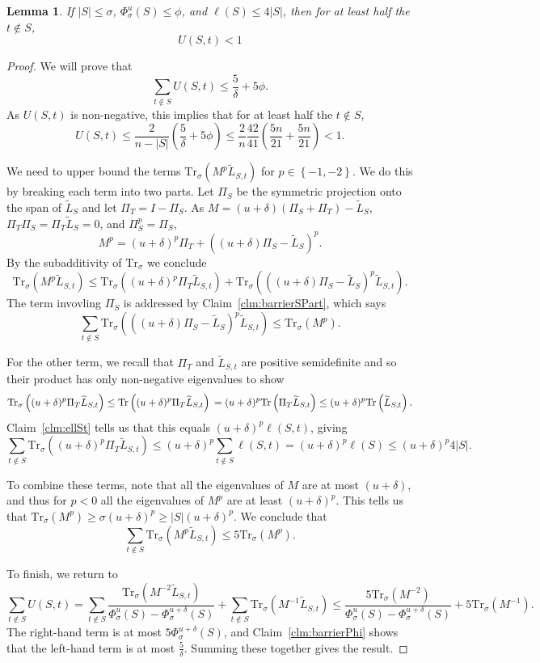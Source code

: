 \documentclass[11pt]{article}
\def\trace#1{\mathrm{Tr} \left(#1 \right)}
\def\Ltil{\widetilde{L}}
\def\setof#1{\left\{#1  \right\}}
\def\sizeof#1{\left|#1  \right|}
\def\trs#1{\mathrm{Tr}_{\sigma} \left(#1 \right)}
\def\Trs{\mathrm{Tr}_{\sigma}}
\newtheorem{lemma}[theorem]{Lemma}
\begin{document}
\begin{lemma}\label{lem:barrier}
If $\sizeof{S} \leq \sigma$, $\Phi^{u}_{\sigma} (S) \leq \phi$, and $\ell(S) \leq 4 \sizeof{S}$, then for at least half the $t \not \in S$, 
\[
U (S,t)
<
1
\]
\end{lemma}
\begin{proof}
We will prove that 
\[
\sum_{t \not \in S} U(S,t) \leq \frac{5}{\delta} + 5 \phi.
\]
As $U(S,t)$ is non-negative, this implies that for at least half the $t \not \in S$, 
\[
U(S,t) \leq \frac{2}{n - \sizeof{S}} \left( \frac{5}{\delta} + 5 \phi \right)
\leq \frac{2}{n} \frac{42}{41} \left( \frac{5 n}{21} + \frac{5 n}{21} \right)
< 1.
\]  

We need to upper bound the terms $\trs{M^{p} \Ltil_{S,t}}$ for $p \in \setof{-1,-2}$.
We do this by breaking each term into two parts.
Let $\Pi_{S}$ be the symmetric  projection onto the span of $\Ltil_{S}$
  and let $\Pi_{T} = I - \Pi_{S}$.
As $M = (u + \delta) (\Pi_{S} + \Pi_{T}) - \Ltil_{S}$, 
  $\Pi_{T} \Pi_{S} = \Pi_{T} \Ltil_{S} = 0$,
  and $\Pi_{S}^p = \Pi_{S}$, 
\[ 
  M^p = (u + \delta)^p \Pi_{T} +  
    \left( (u + \delta) \Pi_{S} - \Ltil_{S} \right)^p.
\]  
By the subadditivity of $\Trs$ 
 we conclude
\[ 
\trs{M^{p} \Ltil_{S,t}}
\leq 
\trs{ (u + \delta)^p \Pi_{T} \Ltil_{S,t}}
+
\trs{ \left( (u + \delta) \Pi_{S} - \Ltil_{S} \right)^p \Ltil_{S,t}}.
\]
The term invovling $\Pi_{S}$ is addressed by Claim~\ref{clm:barrierSPart}, which says
\[
  \sum_{t \not \in S} 
  \trs{\left( (u+\delta)\Pi_{S} - \Ltil_{S} \right)^{p} \Ltil_{S,t}}
\leq
  \trs{M^{p}}.
\]

For the other term, we recall that $\Pi_{T}$ and $\Ltil_{S,t}$ are positive semidefinite and so their product has only non-negative eigenvalues to show
\[
\trs{ (u + \delta)^p \Pi_{T} \Ltil_{S,t}}
\leq 
\trace{ (u + \delta)^p \Pi_{T} \Ltil_{S,t}}
\\ = 
(u + \delta)^p \trace{ \Pi_{T} \Ltil_{S,t}}
\leq 
(u + \delta)^p \trace{\Ltil_{S,t}}.
\]
Claim~\ref{clm:ellSt} tells us that this equals $(u + \delta)^p \ell(S,t)$, giving
\[
\sum_{t \not \in S} \trs{ (u + \delta)^p \Pi_{T} \Ltil_{S,t}}
\leq 
(u + \delta)^p \sum_{t \not \in S} \ell(S,t) 
= 
(u + \delta)^p \ell(S)
\leq 
(u + \delta)^p 4 \sizeof{S}.
\]

To combine these terms, note that all the eigenvalues of $M$ are at most $(u+\delta)$, and thus for $p < 0$ all the eigenvalues of $M^p$ are at least $(u+\delta)^p$. 
This tells us that $\trs{M^p} \geq \sigma (u+\delta)^p \geq \sizeof{S} (u+\delta)^p$. 
We conclude that
\[
\sum_{t \not \in S} \trs{M^p \Ltil_{S,t}}
\leq 
5 \trs{M^p}.
\]

To finish, we return to  
\[
\sum_{t \not \in S}
U (S,t)
= 
\sum_{t \not \in S}
\frac{\trs{M^{-2} \Ltil_{S,t}}}
     {\Phi^{u}_{\sigma} (S) - \Phi^{u+\delta }_{\sigma} (S) }
+ 
\sum_{t \not \in S}
\trs{M^{-1} \Ltil_{S,t}}
\leq
\frac{5 \trs{M^{-2}}}
     {\Phi^{u}_{\sigma} (S) - \Phi^{u+\delta }_{\sigma} (S) }
+ 
5 \trs{M^{-1}}.
\]
The right-hand term is at most $5 \Phi^{u+\delta}_{\sigma} (S)$,
  and Claim~\ref{clm:barrierPhi} shows that
  the left-hand term is at most $\frac{5}{\delta}$.
Summing these together gives the result.
\end{proof}
\end{document}
